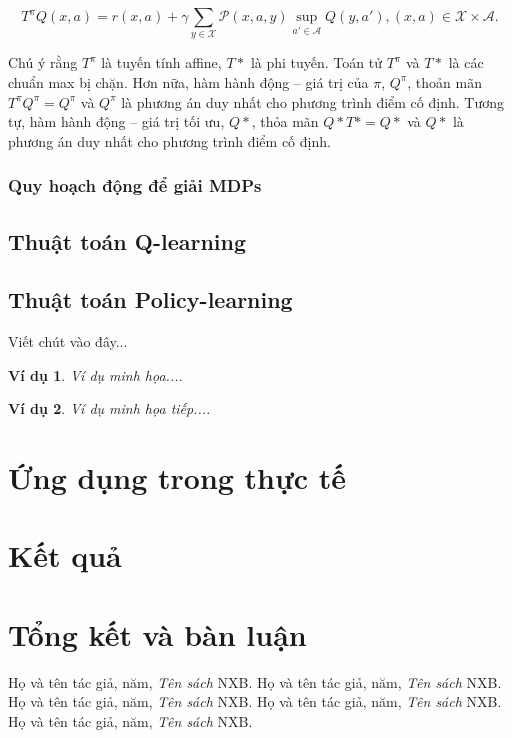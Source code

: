 \documentclass[14pt,a4paper,oneside]{report}		%
\begin{document}
\begin{equation} \label{eq15}
T^\pi Q(x,a)= r(x,a) + \gamma \displaystyle\sum_{y\in\mathcal{X}}\mathcal{P}(x,a,y)\sup_{a'\in\mathcal{A}}Q(y,a'), (x,a)\in\mathcal{X}\times\mathcal{A}.
\end{equation}

Chú ý rằng $T^\pi$ là tuyến tính affine, $T*$ là phi tuyến. Toán tử $T^\pi$ và $T*$ là các chuẩn max bị chặn. Hơn nữa, hàm hành động – giá trị của $\pi$, $Q^\pi$, thoản mãn $T^\pi Q^\pi=Q^\pi$ và $Q^\pi$ là phương án duy nhất cho phương trình điểm cố định. Tương tự, hàm hành động – giá trị tối ưu, $Q*$, thỏa mãn $Q*T*=Q*$ và $Q*$ là phương án duy nhất cho phương trình điểm cố định.

\subsection{Quy hoạch động để giải MDPs}

\section{Thuật toán Q-learning}
\section{Thuật toán Policy-learning}
Viết chút vào đây...

\newtheorem{vd}{Ví dụ}		%
\begin{vd}
Ví dụ minh họa....
\end{vd}

\begin{vd}
Ví dụ minh họa tiếp....
\end{vd}

\chapter{Ứng dụng trong thực tế}
\chapter{Kết quả}
\chapter{Tổng kết và bàn luận}
\begin{thebibliography}{12}
Họ và tên tác giả, năm, {\it Tên sách} NXB.
Họ và tên tác giả, năm, {\it Tên sách} NXB.
Họ và tên tác giả, năm, {\it Tên sách} NXB.
Họ và tên tác giả, năm, {\it Tên sách} NXB.
Họ và tên tác giả, năm, {\it Tên sách} NXB.
\end{thebibliography}


\end{document}
